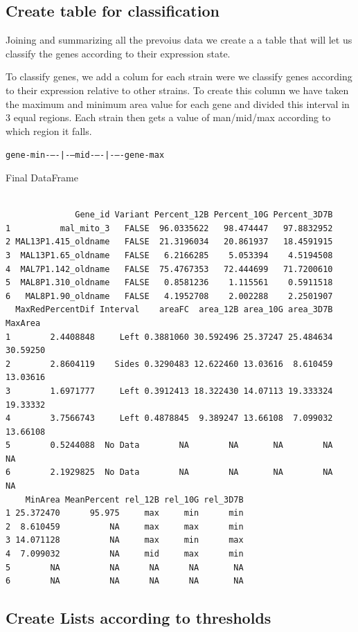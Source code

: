 \documentclass[11pt]{article}
\begin{document}
\subsection{Create table for classification}
\label{sec:orgb90221d}
Joining and summarizing all the prevoius data we create a a table that will let us classify the genes according to their expression state.

To classify genes, we add a colum for each strain were we classify genes according to their expression relative to other strains.
To create this column we have taken the maximum and minimum area value for each gene and divided this interval in 3 equal regions. Each strain then gets a value of man/mid/max according to which region it falls.

\texttt{gene-min-{}--{}-|-{}--mid-{}--{}-|-{}--{}-gene-max}

Final DataFrame
\begin{verbatim}

              Gene_id Variant Percent_12B Percent_10G Percent_3D7B
1          mal_mito_3   FALSE  96.0335622   98.474447   97.8832952
2 MAL13P1.415_oldname   FALSE  21.3196034   20.861937   18.4591915
3  MAL13P1.65_oldname   FALSE   6.2166285    5.053394    4.5194508
4  MAL7P1.142_oldname   FALSE  75.4767353   72.444699   71.7200610
5  MAL8P1.310_oldname   FALSE   0.8581236    1.115561    0.5911518
6   MAL8P1.90_oldname   FALSE   4.1952708    2.002288    2.2501907
  MaxRedPercentDif Interval    areaFC  area_12B area_10G area_3D7B  MaxArea
1        2.4408848     Left 0.3881060 30.592496 25.37247 25.484634 30.59250
2        2.8604119    Sides 0.3290483 12.622460 13.03616  8.610459 13.03616
3        1.6971777     Left 0.3912413 18.322430 14.07113 19.333324 19.33332
4        3.7566743     Left 0.4878845  9.389247 13.66108  7.099032 13.66108
5        0.5244088  No Data        NA        NA       NA        NA       NA
6        2.1929825  No Data        NA        NA       NA        NA       NA
    MinArea MeanPercent rel_12B rel_10G rel_3D7B
1 25.372470      95.975     max     min      min
2  8.610459          NA     max     max      min
3 14.071128          NA     max     min      max
4  7.099032          NA     mid     max      min
5        NA          NA      NA      NA       NA
6        NA          NA      NA      NA       NA
\end{verbatim}

\subsection{Create Lists according to thresholds}
\label{sec:orgd76c737}
\end{document}
